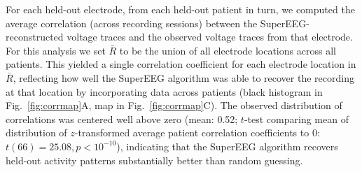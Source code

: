 \documentclass[11pt]{article}
\begin{document}
For each held-out electrode, from each held-out patient in turn, we
computed the average correlation (across recording sessions) between
the SuperEEG-reconstructed voltage traces and the observed voltage
traces from that electrode.  For this analysis we set $\bar{R}$ to be
the union of all electrode locations across all patients.  This
yielded a single correlation coefficient for each electrode location
in $\bar{R}$, reflecting how well the SuperEEG algorithm was able to
recover the recording at that location by incorporating data across
patients (black histogram in Fig.~\ref{fig:corrmap}A, map in
Fig.~\ref{fig:corrmap}C).  The observed distribution of correlations
was centered well above zero (mean: 0.52; $t$-test comparing mean of
distribution of $z$-transformed average patient correlation coefficients
to 0: $t(66) = 25.08, p < 10^{-10}$), indicating that the SuperEEG algorithm
recovers held-out activity patterns substantially better than random
guessing.
\end{document}
